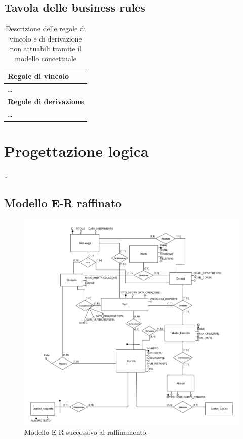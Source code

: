 \documentclass{article}
\begin{document}
\subsection{Tavola delle business rules}
\large
\begin{table}[h]
    \centering
    \begin{tabular}[center]{|p{7cm}|}
    \hline
    \bf Regole di vincolo \\
    \hline
    \dots \\
    \hline
    \bf Regole di derivazione \\ 
    \hline
    \dots \\
    \hline    
\end{tabular}
    \caption{Descrizione delle regole di vincolo e di derivazione non attuabili tramite il modello concettuale}
\end{table}

\newpage
\section{Progettazione logica}
\large
\dots

\subsection{Modello E-R raffinato}
\large
\begin{figure}[H]
    \includegraphics*[width=1.1\textwidth]{foto2.png}
    \caption{Modello E-R successivo al raffinamento.}
\end{figure}
\end{document}
